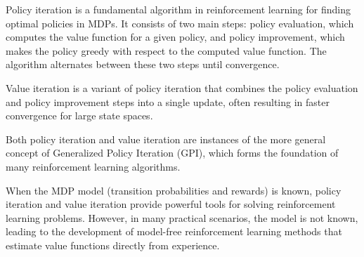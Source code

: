 \documentclass{article}
\begin{document}
Policy iteration is a fundamental algorithm in reinforcement learning for finding optimal policies in MDPs. It consists of two main steps: policy evaluation, which computes the value function for a given policy, and policy improvement, which makes the policy greedy with respect to the computed value function. The algorithm alternates between these two steps until convergence.

Value iteration is a variant of policy iteration that combines the policy evaluation and policy improvement steps into a single update, often resulting in faster convergence for large state spaces.

Both policy iteration and value iteration are instances of the more general concept of Generalized Policy Iteration (GPI), which forms the foundation of many reinforcement learning algorithms.

When the MDP model (transition probabilities and rewards) is known, policy iteration and value iteration provide powerful tools for solving reinforcement learning problems. However, in many practical scenarios, the model is not known, leading to the development of model-free reinforcement learning methods that estimate value functions directly from experience.
\end{document}
